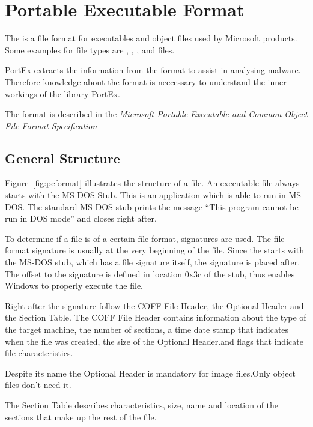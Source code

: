\chapter{Portable Executable Format} \label{chap:peformat}

The \PE{} is a file format for executables and object files used by Microsoft products. Some examples for \PE{} file types are \DLL{}, \FON{}, \DRV{}, \SYS{} and \EXE{} files.

PortEx extracts the information from the \PE{} format to assist in analysing malware. Therefore knowledge about the \PE{} format is neccessary to understand the inner workings of the library PortEx.

The \PE{} format is described in the \emph{Microsoft Portable Executable and Common Object File Format Specification} \cite{pespec}

\section{General Structure}

Figure~\ref{fig:peformat} illustrates the structure of a \PE{} file. An executable \PE{} file always starts with the MS-DOS Stub. This is an application which is able to run in MS-DOS. The standard MS-DOS stub prints the message \enquote{This program cannot be run in DOS mode} and closes right after. 

To determine if a file is of a certain file format, signatures are used. The file format signature is usually at the very beginning of the file. Since the \PE{} starts with the MS-DOS stub, which has a file signature itself, the \PE{} signature is placed after.  The offset to the \PE{} signature is defined in location 0x3c of the stub, thus enables Windows to properly execute the \PE{} file. 

Right after the signature follow the COFF File Header, the Optional Header and the Section Table. The COFF File Header contains information about the type of the target machine, the number of sections, a time date stamp that indicates when the file was created, the size of the Optional Header.and flags that indicate file characteristics.

Despite its name the Optional Header is mandatory for image files.Only object files don't need it.

The Section Table describes \ia{} characteristics, size, name and location of the sections that make up the rest of the \PE{} file.

